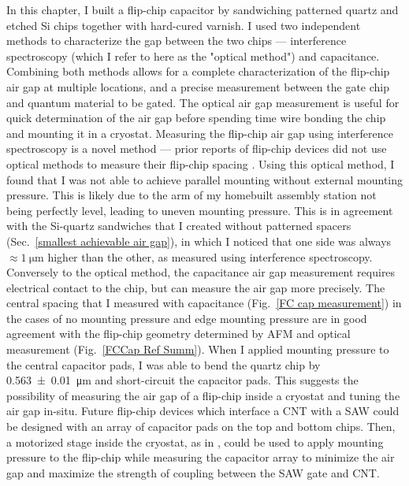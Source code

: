 \documentclass{beavtex_dub_edit}
\begin{document}
In this chapter, I built a flip-chip capacitor by sandwiching patterned quartz and etched Si chips together with hard-cured varnish. I used two independent methods to characterize the gap between the two chips — interference spectroscopy (which I refer to here as the "optical method") and capacitance. Combining both methods allows for a complete characterization of the flip-chip air gap at multiple locations, and a precise measurement between the gate chip and quantum material to be gated. The optical air gap measurement is useful for quick determination of the air gap before spending time wire bonding the chip and mounting it in a cryostat. Measuring the flip-chip air gap using interference spectroscopy is a novel method — prior reports of flip-chip devices did not use optical methods to measure their flip-chip spacing \cite{beukman_noninvasive_2015, chu_creation_2018,satzinger_quantum_2018,bennaceur_mechanical_2015}. Using this optical method, I found that I was not able to achieve parallel mounting without external mounting pressure. This is likely due to the arm of my homebuilt assembly station not being perfectly level, leading to uneven mounting pressure. This is in agreement with the Si-quartz sandwiches that I created without patterned spacers (Sec.\ \ref{smallest achievable air gap}), in which I noticed that one side was always $\approx \SI{1}{\micro\meter}$ higher than the other, as measured using interference spectroscopy. Conversely to the optical method, the capacitance air gap measurement requires electrical contact to the chip, but can measure the air gap more precisely. The central spacing that I measured with capacitance (Fig.\ \ref{FC cap measurement}) in the cases of no mounting pressure and edge mounting pressure are in good agreement with the flip-chip geometry determined by AFM and optical measurement (Fig.\ \ref{FCCap Ref Summ}). When I applied mounting pressure to the central capacitor pads, I was able to bend the quartz chip by \SI{0.563(10)}{\micro\meter} and short-circuit the capacitor pads. This suggests the possibility of measuring the air gap of a flip-chip inside a cryostat and tuning the air gap in-situ. Future flip-chip devices which interface a CNT with a SAW could be designed with an array of capacitor pads on the top and bottom chips. Then, a motorized stage inside the cryostat, as in \cite{inbar_quantum_2023}, could be used to apply mounting pressure to the flip-chip while measuring the capacitor array to minimize the air gap and maximize the strength of coupling between the SAW gate and CNT. 
\end{document}
